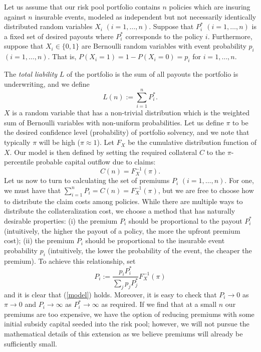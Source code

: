 \documentclass[12pt,a4paper]{article}
\begin{document}
Let us assume that our risk pool portfolio contains $n$ policies which are insuring against $n$ insurable events, modeled as independent but not necessarily identically distributed random variables $X_i$ $(i=1,\ldots,n)$. Suppose that $P^*_i$ $(i=1,\ldots,n)$ is a fixed set of desired payouts where $P^*_i$ corresponds to the policy $i$. Furthermore, suppose that $X_i\in\{0,1\}$ are Bernoulli random variables with event probability $p_i$ $(i=1,\ldots,n)$. That is, $P(X_i = 1) = 1 - P(X_i = 0) = p_i$ for $i = 1,\ldots,n$. 

The \textit{total liability} $L$ of the portfolio is the sum of all payouts the portfolio is underwriting, and we define 
   $$L(n) := \sum_{i=1}^n P^*_i.$$
$X$ is a random variable that has a non-trivial distribution which is the weighted sum of Bernoulli variables with non-uniform probabilities. Let us define $\pi$ to be the desired confidence level (probability) of portfolio solvency, and we note that typically $\pi$ will be high ($\pi\approx 1$). Let $F_X$ be the cumulative distribution function of $X$. Our model is then defined by setting the required collateral $C$ to the $\pi$-percentile probable capital outflow due to claims:
\begin{equation}
    \label{model}
    C(n) = F_X^{-1}(\pi).
\end{equation}
Let us now to turn to calculating the set of premiums $P_i$ $(i=1,\ldots,n)$. For one, we must have that $\sum_{i=1}^n P_i = C(n) = F_X^{-1}(\pi)$, but we are free to choose how to distribute the claim costs among policies. While there are multiple ways to distribute the collateralization cost, we choose a method that has naturally desirable properties: (i) the premium $P_i$ should be proportional to the payout $P_i^*$ (intuitively, the higher the payout of a policy, the more the upfront premium cost); (ii) the premium $P_i$ should be proportional to the insurable event probability $p_i$ (intuitively, the lower the probability of the event, the cheaper the premium). To achieve this relationship, set
     $$P_i := \frac{p_iP_i^*}{\sum_j p_jP_j^*} F_X^{-1}(\pi)$$
and it is clear that (\ref{model}) holds. Moreover, it is easy to check that $P_i \to 0$ as $\pi \to 0$ and $P_i\to\infty$ as $P_i^*\to\infty$ as required. If we find that at a small $n$ our premiums are too expensive, we have the option of reducing premiums with some initial subsidy capital seeded into the risk pool; however, we will not pursue the mathematical details of this extension as we believe premiums will already be sufficiently small.
\end{document}
